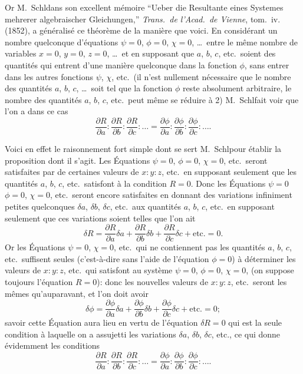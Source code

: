 \documentclass[11pt,a4paper]{book}
\theoremstyle{plain}
\begin{document}
Or M.~Schl\afli dans son excellent m\'{e}moire ``Ueber die Resultante eines Systemes mehrerer algebraischer Gleichungen,'' \textit{Trans.\ de l'Acad.\ de Vienne}, tom.~iv. (1852), a g\'{e}n\'{e}ralis\'{e} ce th\'{e}or\`{e}me de la mani\`{e}re que voici. En consid\'{e}rant un nombre quelconque d'\'{e}quations $\psi=0$, $\phi=0$, $\chi=0$, \ldots\ entre le m\^{e}me nombre de variables $x=0$, $y=0$, $z=0$, \ldots\ et en supposant que $a$, $b$, $c$, etc.\ soient des quantit\'{e}s qui entrent d'une mani\`{e}re quelconque dans la fonction $\phi$, sans entrer dans les autres fonctions $\psi$, $\chi$, etc.\ (il n'est nullement n\'{e}cessaire que le nombre des quantit\'{e}s $a$, $b$, $c$, \ldots\ soit tel que la fonction $\phi$ reste absolument arbitraire, le nombre des quantit\'{e}s $a$, $b$, $c$, etc.\ peut m\^{e}me se r\'{e}duire \`{a} 2) M.~Schl\afli fait voir que l'on a dans ce cas
\[
\frac{\partial R}{\partial a}:\frac{\partial R}{\partial b}:\frac{\partial R}{\partial c}:\ldots
=\frac{\partial\phi}{\partial a}:\frac{\partial\phi}{\partial b}:\frac{\partial\phi}{\partial c}:\ldots.
\]

Voici en effet le raisonnement fort simple dont se sert M.~Schl\afli pour \'{e}tablir la proposition dont il s'agit. Les \'{E}quations $\psi=0$, $\phi=0$, $\chi=0$, etc.\ seront satisfaites par de certaines valeurs de $x:y:z$, etc.\ en supposant seulement que les quantit\'{e}s $a$, $b$, $c$, etc.\ satisfont \`{a} la condition $R=0$. Donc les \'{E}quations $\psi=0$ $\phi=0$, $\chi=0$, etc.\ seront encore satisfaites en donnant des variations infiniment petites quelconques $\delta a$, $\delta b$, $\delta c$, etc.\ aux quantit\'{e}s $a$, $b$, $c$, etc.\ en supposant seulement que ces variations soient telles que l'on ait
\[
\delta R=\frac{\partial R}{\partial a}\delta a+\frac{\partial R}{\partial b}\delta b+\frac{\partial R}{\partial c}\delta c+\text{etc.}=0.
\]
Or les \'{E}quations $\psi=0$, $\chi=0$, etc.\ qui ne contiennent pas les quantit\'{e}s $a$, $b$, $c$, etc.\ suffisent seules (c'est-\`{a}-dire sans l'aide de l'\'{e}quation $\phi=0$) \`{a} d\'{e}terminer les valeurs de $x:y:z$, etc.\ qui satisfont au syst\`{e}me $\psi=0$, $\phi=0$, $\chi=0$, (on suppose toujours l'\'{e}quation $R=0$): donc les nouvelles valeurs de $x:y:z$, etc.\ seront les m\^{e}mes qu'auparavant, et l'on doit avoir
\[
\delta\phi=\frac{\partial\phi}{\partial a}\delta a+\frac{\partial\phi}{\partial b}\delta b+\frac{\partial\phi}{\partial c}\delta c+\text{etc.}=0;
\]
savoir cette \'{E}quation aura lieu en vertu de l'\'{e}quation $\delta R=0$ qui est la seule condition \`{a} laquelle on a assujetti les variations $\delta a$, $\delta b$, $\delta c$, etc., ce qui donne \'{e}videmment les conditions
\[
\frac{\partial R}{\partial a}:\frac{\partial R}{\partial b}:\frac{\partial R}{\partial c}:\ldots
=\frac{\partial\phi}{\partial a}:\frac{\partial\phi}{\partial b}:\frac{\partial\phi}{\partial c}:\ldots.
\]
\end{document}
